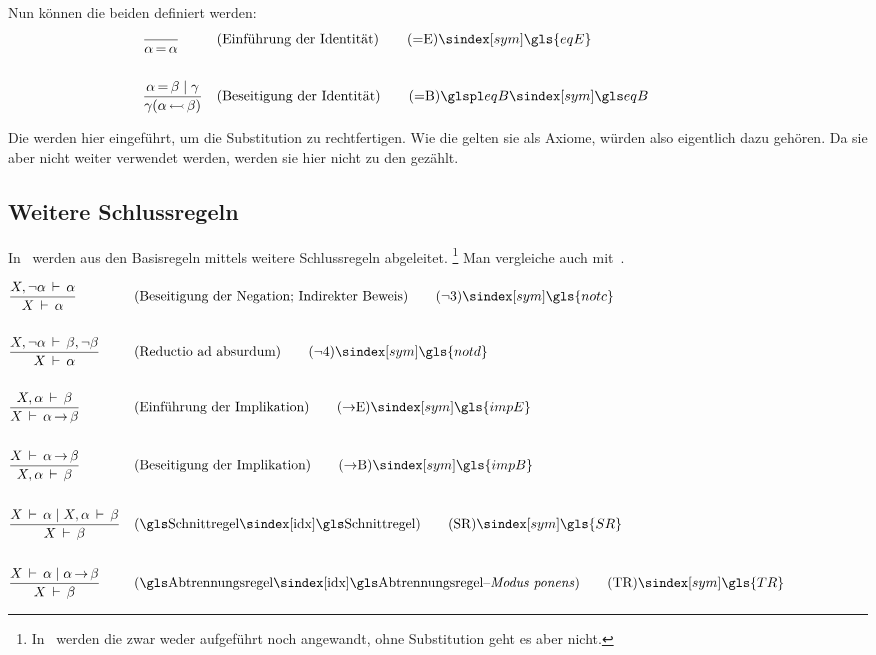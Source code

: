 Nun können die beiden  definiert werden:
\begin{align}
	& \frac{}{\alpha\eq\alpha}
	& & (\text{Einführung der Identität})
	\tag{\tageqE} \sym{\gls{eqE}} \label{def:eqE}
	\\\\
	& \frac{\alpha\eq\beta \und \gamma}{\gamma(\alpha\subst\beta)}
	& & (\text{Beseitigung der Identität})
	\tag{\tageqB} \glsSym{eqB} \label{def:eqB}
	\formulatoleft
\end{align}

Die  werden hier eingeführt, um die Substitution zu rechtfertigen.
Wie die  gelten sie als Axiome, würden also eigentlich dazu gehören.
Da sie aber nicht weiter verwendet werden, werden sie hier nicht zu den  gezählt.

\subsection{Weitere Schlussregeln}%
\label{sub:Schlussregeln}

In~\cite{bib:Rautenberg} werden aus den Basisregeln mittels  weitere Schlussregeln abgeleitet.%
\footnote{%
In~\cite{bib:Rautenberg} werden die  zwar weder aufgeführt noch angewandt, ohne Substitution geht es aber nicht.
}
Man vergleiche auch mit~\cite{bib:NatuerlichesSchliessen}.

\begin{align}
	& \frac{X,\lnot\alpha\derive\alpha}{X\derive\alpha}
	& & (\text{Beseitigung der Negation; Indirekter Beweis})
	\tag{\tagnotc} \sym{\gls{notc}} \label{def:notc}
	\\\\
	& \frac{X,\lnot\alpha\derive\beta,\lnot\beta}{X\derive\alpha}
	& & (\text{Reductio ad absurdum})
	\tag{\tagnotd} \sym{\gls{notd}} \label{def:notd}
	\\\\
	& \frac{X,\alpha\derive\beta}{X\derive\alpha\limp\beta}
	& & (\text{Einführung der Implikation})
	\tag{\tagimpE} \sym{\gls{impE}} \label{def:impE}
	\\\\
	& \frac{X\derive\alpha\limp\beta}{X,\alpha\derive\beta}
	& & (\text{Beseitigung der Implikation})
	\tag{\tagimpB} \sym{\gls{impB}} \label{def:impB}
	\\\\
	& \frac{X\derive\alpha \und X,\alpha\derive\beta}{X\derive\beta}
	& & (\text{\glsIdx{Schnittregel}})
	\tag{\tagSR} \sym{\gls{SR}} \label{def:SR}
	\\\\
	& \frac{X\derive\alpha \und \alpha\limp\beta}{X\derive\beta}
	& & (\text{\glsIdx{Abtrennungsregel}--\emph{Modus ponens}})
	\tag{\tagTR} \sym{\gls{TR}} \label{def:TR}
	\formulatoleft
\end{align}

